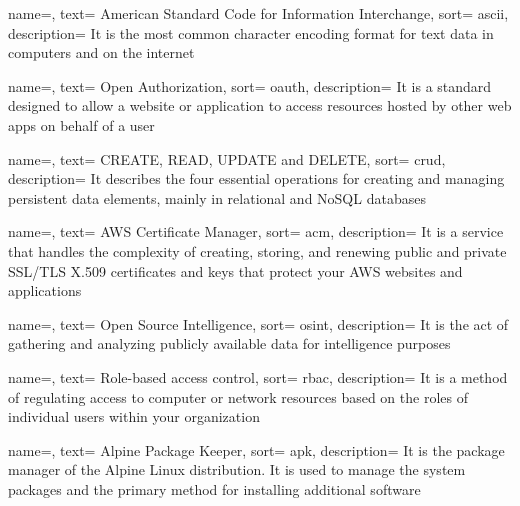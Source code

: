{
  name=,
  text= American Standard Code for Information Interchange,
  sort= ascii,
  description= {It is the most common character encoding format for text data in computers and on the internet}
}

{
  name=,
  text= Open Authorization,
  sort= oauth,
  description= {It is a standard designed to allow a website or application to access resources hosted by other web apps on behalf of a user}
}

{
  name=,
  text= {CREATE, READ, UPDATE and DELETE},
  sort= crud,
  description= {It describes the four essential operations for creating and managing persistent data elements, mainly in relational and NoSQL databases}
}

{
  name=,
  text= AWS Certificate Manager,
  sort= acm,
  description= {It is a service that handles the complexity of creating, storing, and renewing public and private SSL/TLS X.509 certificates and keys that protect your AWS websites and applications}
}

{
  name=,
  text= Open Source Intelligence,
  sort= osint,
  description= {It is the act of gathering and analyzing publicly available data for intelligence purposes}
}

{
  name=,
  text= Role-based access control,
  sort= rbac,
  description= {It is a method of regulating access to computer or network resources based on the roles of individual users within your organization}
}

{
  name=,
  text= Alpine Package Keeper,
  sort= apk,
  description= {It is the package manager of the Alpine Linux distribution. It is used to manage the system packages and the primary method for installing additional software}
}


